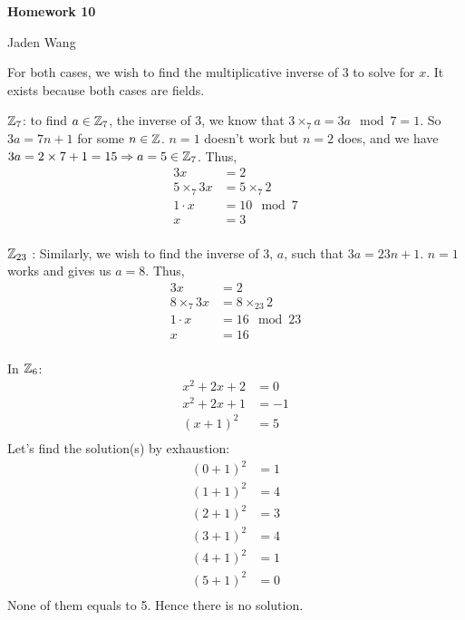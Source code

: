 \documentclass[12pt]{article}
\begin{document}
\centerline {\textsf{\textbf{\LARGE{Homework 10}}}}
\centerline {Jaden Wang}
\vspace{.15in}

\begin{problem}[19.2]
	For both cases, we wish to find the multiplicative inverse of $ 3$  to solve for $ x$. It exists because both cases are fields.
\begin{case}[]
	$ \mathbb{Z}_7$: to find $ a \in \mathbb{Z}_7$, the inverse of $ 3$, we know that $ 3 \times_7 a = 3 a \mod 7= 1$. So $ 3a = 7n +1 $ for some  $ n \in \mathbb{Z}$. $ n=1$ doesn't work but  $ n=2$ does, and we have  $ 3a=2 \times 7 + 1 = 15 \Rightarrow a = 5 \in \mathbb{Z}_7$. Thus,
	\begin{align*}
		3x &= 2 \\ 
		5 \times_7 3 x &= 5 \times_7 2 \\ 
		1 \cdot x &= 10 \mod 7\\
		x&= 3 \\
\end{align*}
\end{case}

\begin{case}[]
	$ \mathbb{Z}_{23}$ : Similarly, we wish to find the inverse of 3, $ a$,  such that $ 3a=23n+1$.  $ n=1$ works and gives us  $ a=8$. Thus,
	 \begin{align*}
		3x&= 2 \\
		8 \times_7 3 x&= 8 \times_{23} 2 \\
		1 \cdot x&= 16 \mod 23 \\
		x &= 16 \\
	\end{align*}
\end{case}
\end{problem}
\begin{problem}[19.3]
In $ \mathbb{Z}_6$:
\begin{align*}
	x^2+2x+2 &= 0 \\
	x^2 + 2x + 1 &= -1 \\
	(x+1)^2 & =5 \\
\end{align*}
Let's find the solution(s) by exhaustion:
\begin{align*}
	(0+1)^2 &= 1\\
	(1+1)^2 &= 4 \\
	(2+1)^2 &= 3 \\
	(3+1)^2 &= 4 \\
	(4+1)^2 &= 1 \\
	(5+1)^2 &= 0 \\
\end{align*}
None of them equals to 5. Hence there is no solution.
\end{problem}
\end{document}
